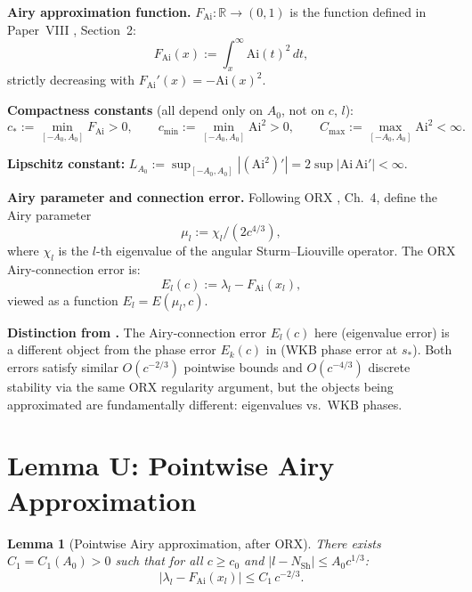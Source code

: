 \documentclass[12pt]{amsart}
\newtheorem{lemma}[theorem]{Lemma}
\newcommand{\FAi}{F_{\mathrm{Ai}}}
\newcommand{\NSh}{N_{\mathrm{Sh}}}
\begin{document}
\medskip
\noindent\textbf{Airy approximation function.}
$\FAi : \mathbb{R} \to (0,1)$ is the function defined in
Paper~VIII \cite{paperVIII}, Section~2:
\[
  \FAi(x) := \int_x^\infty \mathrm{Ai}(t)^2\,dt,
\]
strictly decreasing with $\FAi'(x) = -\mathrm{Ai}(x)^2$.

\medskip
\noindent\textbf{Compactness constants}
(all depend only on $A_0$, not on $c$, $l$):
\[
  c_* := \min_{[-A_0, A_0]} \FAi > 0, \qquad
  c_{\min} := \min_{[-A_0, A_0]} \mathrm{Ai}^2 > 0, \qquad
  C_{\max} := \max_{[-A_0, A_0]} \mathrm{Ai}^2 < \infty.
\]

\medskip
\noindent\textbf{Lipschitz constant:}
$L_{A_0} := \sup_{[-A_0,A_0]} |(\mathrm{Ai}^2)'|
= 2\sup |\mathrm{Ai}\,\mathrm{Ai}'| < \infty$.

\medskip
\noindent\textbf{Airy parameter and connection error.}
Following ORX \cite{OsipovRokhlinXiao}, Ch.~4,
define the Airy parameter
\begin{equation}\label{eq:mul}
  \mu_l := \chi_l / (2c^{4/3}),
\end{equation}
where $\chi_l$ is the $l$-th eigenvalue of the angular
Sturm--Liouville operator.
The ORX Airy-connection error is:
\begin{equation}\label{eq:El}
  E_l(c) := \lambda_l - \FAi(x_l),
\end{equation}
viewed as a function $E_l = E(\mu_l, c)$.

\medskip
\noindent\textbf{Distinction from \cite{PhaseNondeg}.}
The Airy-connection error $E_l(c)$ here (eigenvalue error)
is a different object from the phase error $E_k(c)$
in \cite{PhaseNondeg} (WKB phase error at $s_*$).
Both errors satisfy similar $O(c^{-2/3})$ pointwise bounds
and $O(c^{-4/3})$ discrete stability via the same
ORX regularity argument,
but the objects being approximated are fundamentally
different: eigenvalues vs.\ WKB phases.

\section{Lemma U: Pointwise Airy Approximation}
\label{sec:lemmaU}

\begin{lemma}[Pointwise Airy approximation, after ORX]
\label{lem:U}
There exists $C_1 = C_1(A_0) > 0$ such that
for all $c \ge c_0$ and $|l - \NSh| \le A_0 c^{1/3}$:
\begin{equation}\label{eq:U}
  |\lambda_l - \FAi(x_l)| \le C_1\,c^{-2/3}.
\end{equation}
\end{lemma}
\end{document}
